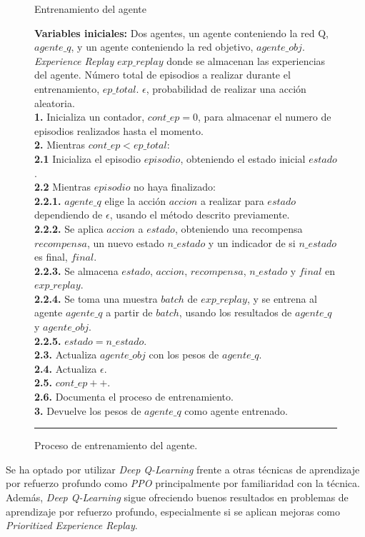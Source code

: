 \begin{figure}[h]
\begin{algorithm}[H]
\caption{Entrenamiento del agente}
\textbf{Variables iniciales:} Dos agentes, un agente conteniendo la red Q, $agente\_q$, y un agente conteniendo la red objetivo, $agente\_obj$. \textit{Experience Replay} $exp\_replay$ donde se almacenan las experiencias del agente. Número total de episodios a realizar durante el entrenamiento, $ep\_total$. $\epsilon$, probabilidad de realizar una acción aleatoria.\\
\textbf{1.} Inicializa un contador, $cont\_ep=0$, para almacenar el numero de episodios realizados hasta el momento.\\
\textbf{2.} Mientras $cont\_ep < ep\_total$:\\
\Indp \textbf{2.1} Inicializa el episodio $episodio$, obteniendo el estado inicial $estado$.\\
\textbf{2.2} Mientras $episodio$ no haya finalizado:\\
\Indp \textbf{2.2.1.} $agente\_q$ elige la acción $accion$ a realizar para $estado$ dependiendo de $\epsilon$, usando el método descrito previamente.\\
\textbf{2.2.2.} Se aplica $accion$ a $estado$, obteniendo una recompensa $recompensa$, un nuevo estado $n\_estado$ y un indicador de si $n\_estado$ es final, $final$.\\
\textbf{2.2.3.} Se almacena $estado$, $accion$, $recompensa$, $n\_estado$ y $final$ en $exp\_replay$.\\
\textbf{2.2.4.} Se toma una muestra $batch$ de $exp\_replay$, y se entrena al agente $agente\_q$ a partir de $batch$, usando los resultados de $agente\_q$ y $agente\_obj$.\\
\textbf{2.2.5.} $estado=n\_estado$.\\
\Indm \textbf{2.3.} Actualiza $agente\_obj$ con los pesos de $agente\_q$.\\
\textbf{2.4.} Actualiza $\epsilon$.\\
\textbf{2.5.} $cont\_ep++$.\\
\textbf{2.6.} Documenta el proceso de entrenamiento.\\
\Indm \textbf{3.} Devuelve los pesos de $agente\_q$ como agente entrenado.
\end{algorithm}
\hrule
\caption{Proceso de entrenamiento del agente.}
\label{alg:chap5-dql}
\end{figure}

Se ha optado por utilizar \textit{Deep Q-Learning} frente a otras técnicas de aprendizaje por refuerzo profundo como \textit{PPO} principalmente por familiaridad con la técnica. Además, \textit{Deep Q-Learning} sigue ofreciendo buenos resultados en problemas de aprendizaje por refuerzo profundo, especialmente si se aplican mejoras como \textit{Prioritized Experience Replay}.

